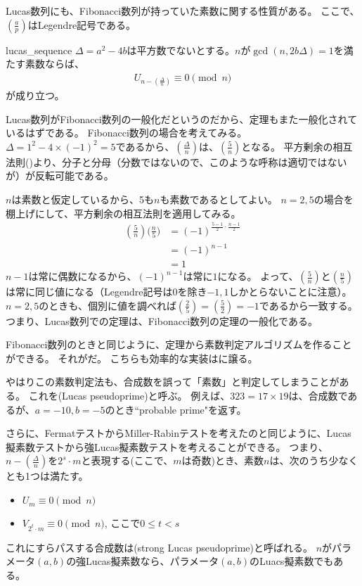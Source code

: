 Lucas数列にも、Fibonacci数列が持っていた素数に関する性質がある。
ここで、$\left(\frac{a}{p}\right)$はLegendre記号である。

\begin{Theo}{}{lucas_sequence}
$\Delta=a^2-4b$は平方数でないとする。$n$が$\gcd(n, 2b\Delta)=1$を満たす素数ならば、
\begin{align*}
U_{n - \left(\frac{\Delta}{n}\right)} \equiv 0 \pmod{n}
\end{align*}
が成り立つ。
\end{Theo}

Lucas数列がFibonacci数列の一般化だというのだから、定理もまた一般化されているはずである。
Fibonacci数列の場合を考えてみる。
$\Delta = 1^2-4\times(-1)^2=5$であるから、$\left(\frac{\Delta}{n}\right)$は、$\left(\frac{5}{n}\right)$となる。
平方剰余の相互法則()より、分子と分母（分数ではないので、このような呼称は適切ではないが）が反転可能である。

$n$は素数と仮定しているから、5も$n$も素数であるとしてよい。
$n=2, 5$の場合を棚上げにして、平方剰余の相互法則を適用してみる。
\begin{align*}
\left(\frac{5}{n}\right) \bigg(\frac{n}{5}\bigg) &= (-1)^{\frac{5-1}{2}\cdot\frac{n-1}{2}}\\
&= (-1)^{n-1}\\
&= 1
\end{align*}
$n-1$は常に偶数になるから、$(-1)^{n-1}$は常に$1$になる。
よって、$\left(\frac{5}{n}\right)$と$\left(\frac{n}{5}\right)$は常に同じ値になる（Legendre記号は$0$を除き$-1,1$しかとらないことに注意）。
$n=2, 5$のときも、個別に値を調べれば$\left(\frac{2}{5}\right) = \left(\frac{5}{2}\right) = -1$であるから一致する。
つまり、Lucas数列での定理は、Fibonacci数列の定理の一般化である。

Fibonacci数列のときと同じように、定理から素数判定アルゴリズムを作ることができる。
それがだ。
こちらも効率的な実装はに譲る。


やはりこの素数判定法も、合成数を誤って「素数」と判定してしまうことがある。
これを(Lucas pseudoprime)と呼ぶ。
例えば、$323=17\times19$は、合成数であるが、$a=-10,b=-5$のとき``probable prime"を返す。

さらに、FermatテストからMiller-Rabinテストを考えたのと同じように、Lucas擬素数テストから強Lucas擬素数テストを考えることができる。
つまり、$n - \left(\frac{\Delta}{n}\right)$を$2^s\cdot m$と表現する(ここで、$m$は奇数)とき、素数$n$は、次のうち少なくとも1つは満たす。
\begin{itemize}
 \item $U_m \equiv 0 \pmod{n}$
 \item $V_{2^t\cdot m} \equiv 0 \pmod{n}$, ここで$0\le t<s$
\end{itemize}
これにすらパスする合成数は(strong Lucas pseudoprime)と呼ばれる。
$n$がパラメータ$(a,b)$の強Lucas擬素数なら、パラメータ$(a,b)$のLuacs擬素数でもある。
